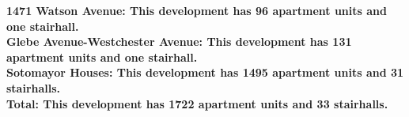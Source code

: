\bf{1471 Watson Avenue}: This development has 96 apartment units and one stairhall.\\\bf{Glebe Avenue-Westchester Avenue}: This development has 131 apartment units and one stairhall.\\\bf{Sotomayor Houses}: This development has 1495 apartment units and 31 stairhalls.\\\bf{Total}: This development has 1722 apartment units and 33 stairhalls.\\